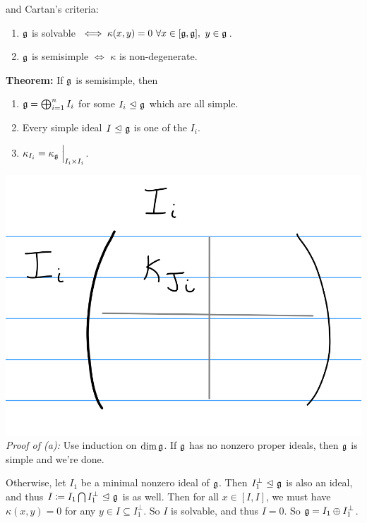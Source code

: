 and Cartan's criteria:

\begin{enumerate}
\def\labelenumi{\arabic{enumi}.}
\tightlist
\item
  \({\mathfrak{g}}\) is solvable
  \(\iff \kappa(x, y) = 0 ~\forall x\in [{\mathfrak{g}}, {\mathfrak{g}}], ~y\in{\mathfrak{g}}\).
\item
  \({\mathfrak{g}}\) is semisimple \(\iff\) \(\kappa\) is non-degenerate.
\end{enumerate}

\textbf{Theorem:} If \({\mathfrak{g}}\) is semisimple, then

\begin{enumerate}
\def\labelenumi{\alph{enumi}.}
\tightlist
\item
  \({\mathfrak{g}} = \bigoplus_{i=1}^n I_i\) for some \(I_i {~\trianglelefteq~} {\mathfrak{g}}\) which
  are all simple.
\item
  Every simple ideal \(I {~\trianglelefteq~} {\mathfrak{g}}\) is one of the \(I_i\).
\item
  \(\kappa_{I_i} = {\kappa_{\mathfrak{g}}}\mathrel{\Big|}_{I_i \times I_i}\).
\end{enumerate}

\includegraphics{figures/2019-09-09-09:40.png}\\

\emph{Proof of (a):} Use induction on \(\dim {\mathfrak{g}}\). If \({\mathfrak{g}}\) has
no nonzero proper ideals, then \({\mathfrak{g}}\) is simple and we're done.

Otherwise, let \(I_1\) be a minimal nonzero ideal of \({\mathfrak{g}}\). Then
\(I_1^\perp {~\trianglelefteq~} {\mathfrak{g}}\) is also an ideal, and thus
\(I \coloneqq I_1 \bigcap I_1^\perp {~\trianglelefteq~} {\mathfrak{g}}\) is as well. Then
for all \(x\in [I, I]\), we must have \(\kappa(x, y)= 0\) for any
\(y\in I \subseteq I_1^\perp\). So \(I\) is solvable, and thus \(I= 0\).
So \({\mathfrak{g}} = I_1 \oplus I_1^\perp\).

